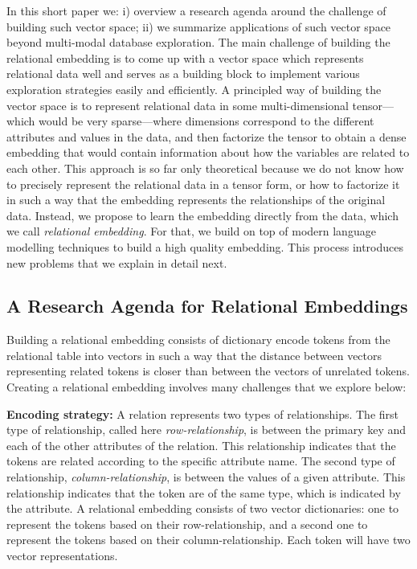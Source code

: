In this short paper we: i) overview a research agenda around the challenge of
building such vector space; ii) we summarize applications of such
vector space beyond multi-modal database exploration. The main challenge of
building the relational embedding is to come up with a vector space which
represents relational data well and serves as a building block to implement
various exploration strategies easily and efficiently. A principled way of
building the vector space is to represent relational data in some
multi-dimensional tensor---which would be very sparse---where dimensions
correspond to the different attributes and values in the data, and then
factorize the tensor to obtain a dense embedding that would contain information
about how the variables are related to each other. This approach is so far only
theoretical because we do not know how to precisely represent the relational
data in a tensor form, or how to factorize it in such a way that the embedding
represents the relationships of the original data. Instead, we propose to learn
the embedding directly from the data, which we call \emph{relational embedding}.
For that, we build on top of modern language modelling techniques to build a
high quality embedding. This process introduces new problems that we explain in
detail next.

\subsection*{A Research Agenda for Relational Embeddings}

Building a relational embedding consists of dictionary encode tokens from the
relational table into vectors in such a way that the distance between vectors
representing related tokens is closer than between the vectors of unrelated
tokens. Creating a relational embedding involves many challenges that we explore
below:

\noindent\textbf{Encoding strategy: } A relation represents two types of
relationships.  The first type of relationship, called here
\emph{row-relationship}, is between the primary key and each of the other
attributes of the relation. This relationship indicates that the tokens are
related according to the specific attribute name. The second type of
relationship, \emph{column-relationship}, is between the values of a given
attribute. This relationship indicates that the token are of the same type,
which is indicated by the attribute. A relational embedding consists of two
vector dictionaries: one to represent the tokens based on their
row-relationship, and a second one to represent the tokens based on their
column-relationship. Each token will have two vector representations. 

